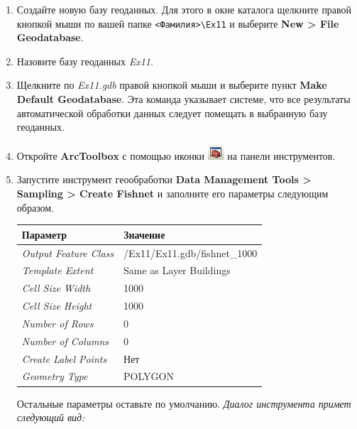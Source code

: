 \documentclass[]{book}
\theoremstyle{definition}
\theoremstyle{definition}
\theoremstyle{definition}
\theoremstyle{remark}
\begin{document}
\begin{enumerate}
\def\labelenumi{\arabic{enumi}.}
\item
  Создайте новую базу геоданных. Для этого в окне каталога щелкните
  правой кнопкой мыши по вашей папке
  \texttt{\textless{}Фамилия\textgreater{}\textbackslash{}Ex11} и
  выберите \textbf{New \textgreater{} File Geodatabase}.
\item
  Назовите базу геоданных \emph{Ex11}.
\item
  Щелкните по \emph{Ex11.gdb} правой кнопкой мыши и выберите пункт
  \textbf{Make Default Geodatabase}. Эта команда указывает системе, что
  все результаты автоматической обработки данных следует помещать в
  выбранную базу геоданных.
\item
  Откройте \textbf{ArcToolbox} с помощью иконки
  \includegraphics{images/Ex11/image7.png} на панели инструментов.
\item
  Запустите инструмент геообработки \textbf{Data Management Tools
  \textgreater{} Sampling \textgreater{} Create Fishnet} и заполните его
  параметры следующим образом.

  \begin{longtable}[]{@{}ll@{}}
  \toprule
  Параметр & Значение\tabularnewline
  \midrule
  \endhead
  \emph{Output Feature Class} &
  /Ex11/Ex11.gdb/fishnet\_1000\tabularnewline
  \emph{Template Extent} & Same as Layer Buildings\tabularnewline
  \emph{Cell Size Width} & 1000\tabularnewline
  \emph{Cell Size Height} & 1000\tabularnewline
  \emph{Number of Rows} & 0\tabularnewline
  \emph{Number of Columns} & 0\tabularnewline
  \emph{Create Label Points} & Нет\tabularnewline
  \emph{Geometry Type} & POLYGON\tabularnewline
  \bottomrule
  \end{longtable}

  Остальные параметры оставьте по умолчанию. \emph{Диалог инструмента
  примет следующий вид:}


\end{enumerate}
\end{document}
